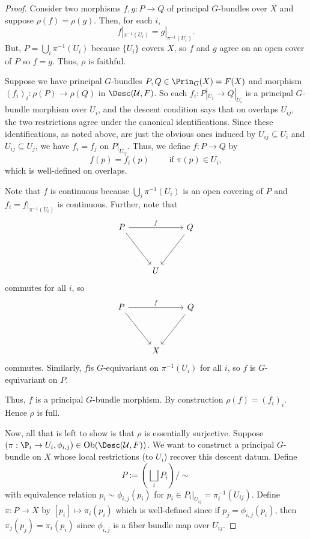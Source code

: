 \begin{proof}
    Consider two morphisms \( f,g: P \to Q \) of principal \( G \)-bundles over \( X \) and suppose \( \rho(f) = \rho(g) \). Then, for each \( i \),
    \[ f|_{\pi^{-1}(U_i)} = g|_{\pi^{-1}(U_i)}. \]
    But, \( P = \bigcup_i \pi^{-1}(U_i) \) because \( \{ U_i \} \) covers \( X \), so \( f \) and \( g \) agree on an open cover of \( P \) so \( f = g \). Thus, \( \rho \) is faithful.
    
    Suppose we have principal \( G \)-bundles \( P,Q \in \Prin_G(X) = F(X) \) and morphism \( (f_i)_i: \rho(P) \to \rho(Q) \) in \( \Desc(\mathcal{U},F) \). So each \( f_i : P|_{U_i} \to Q|_{U_i} \) is a principal \( G \)-bundle morphism over \( U_i \), and the descent condition says that on overlaps \( U_{ij} \), the two restrictions agree under the canonical identifications. Since these identifications, as noted above, are just the obvious ones induced by \( U_{ij} \subseteq U_i \) and \( U_{ij} \subseteq U_j \), we have \( f_i = f_j \) on \( P|_{U_{ij}} \). Thus, we define \( f: P \to Q \) by
    \[ f(p) = f_i(p) \qquad \text{ if } \pi(p) \in U_i, \]
    which is well-defined on overlaps.
    
    Note that \( f \) is continuous because \( \bigcup_i \pi^{-1}(U_i) \) is an open covering of \( P \) and \( f_i = f|_{\pi^{-1}(U_i)} \) is continuous. Further, note that
    \[\begin{tikzcd}
    	P && Q \\
    	\\
    	& U
    	\arrow["f", from=1-1, to=1-3]
    	\arrow[from=1-1, to=3-2]
    	\arrow[from=1-3, to=3-2]
    \end{tikzcd}\]
    commutes for all \( i \), so
    \[\begin{tikzcd}
    	P && Q \\
    	\\
    	& X
    	\arrow["f", from=1-1, to=1-3]
    	\arrow[from=1-1, to=3-2]
    	\arrow[from=1-3, to=3-2]
    \end{tikzcd}\]
    commutes. Similarly, \( f \)is \( G \)-equivariant on \( \pi^{-1}(U_i) \) for all \( i \), so \( f \) is \( G \)-equivariant on \( P \).
    
    Thus, \( f \) is a principal \( G \)-bundle morphism. By construction \( \rho(f) = (f_i)_i \). Hence \( \rho \) is full.
    
    Now, all that is left to show is that \( \rho \) is essentially surjective. Suppose \( (\pi: \P_i \to U_i,\phi_{i,j}) \in \text{Ob}(\Desc(\mathcal{U},F)) \). We want to construct a principal \( G \)-bundle on \( X \) whose local restrictions (to \( U_i \)) recover this descent datum. Define
    \[ P:= \left( \bigsqcup_i P_i \right)/\sim \]
    with equivalence relation \( p_i \sim \phi_{i,j}(p_i) \) for \( p_i \in P_i|_{U_{ij}} = \pi_i^{-1}(U_{ij}) \). Define \( \pi: P \to X \) by \( [p_i] \mapsto \pi_i(p_i) \) which is well-defined since if \( p_j = \phi_{i,j}(p_i) \), then \( \pi_j(p_j) = \pi_i(p_i) \) since \( \phi_{i,j} \) is a fiber bundle map over \( U_{ij} \).
    

\end{proof}
